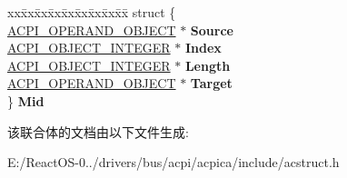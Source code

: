 \begin{DoxyCompactItemize}
\begin{tabbing}
\end{tabbing}\item 
\mbox{\label{unionacpi__aml__operands_ad9ae57b7e8ba803505ec1aec73e7c0bc}} 
\begin{tabbing}
xx\=xx\=xx\=xx\=xx\=xx\=xx\=xx\=xx\=\kill
struct \{\\
\>\hyperlink{unionacpi__operand__object}{ACPI\_OPERAND\_OBJECT} $\ast$ {\bfseries Source}\\
\>\hyperlink{structacpi__object__integer}{ACPI\_OBJECT\_INTEGER} $\ast$ {\bfseries Index}\\
\>\hyperlink{structacpi__object__integer}{ACPI\_OBJECT\_INTEGER} $\ast$ {\bfseries Length}\\
\>\hyperlink{unionacpi__operand__object}{ACPI\_OPERAND\_OBJECT} $\ast$ {\bfseries Target}\\
\} {\bfseries Mid}\\

\end{tabbing}\end{DoxyCompactItemize}


该联合体的文档由以下文件生成\+:\begin{DoxyCompactItemize}
\item 
E\+:/\+React\+O\+S-\/0../drivers/bus/acpi/acpica/include/acstruct.\+h\end{DoxyCompactItemize}
